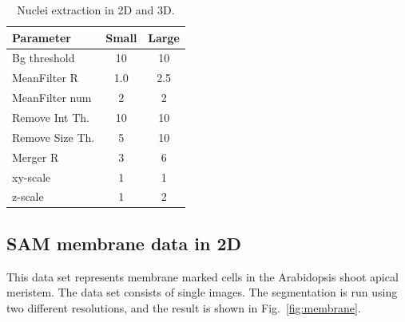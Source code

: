 \documentclass[a4paper,12pt]{article}
\begin{document}
\begin{table}
	\begin{center}
		\begin{tabular}{|l|cc|}
			\hline
			Parameter & Small & Large\\
			\hline
			Bg threshold & 10 & 10\\
			MeanFilter R & 1.0 & 2.5\\
			MeanFilter num & 2 & 2\\
			Remove Int Th. & 10 & 10\\
			Remove Size Th. & 5 & 10\\
			Merger R & 3 & 6\\
			xy-scale & 1 & 1\\
			z-scale & 1 & 2\\
			\hline
		\end{tabular}
		\caption{Nuclei extraction in 2D and 3D.}
		\label{tab:43zoom}
	\end{center}
\end{table}

\subsection{SAM membrane data in 2D}

This data set represents membrane marked cells in the Arabidopsis shoot apical
meristem. The data set consists of single images. The segmentation is run
using two different resolutions, and the result is shown in
Fig.~\ref{fig:membrane}.
\end{document}
